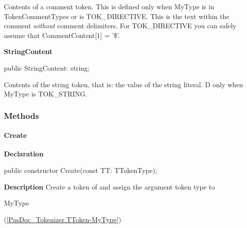 \documentclass{report}
\newif\ifpdf
\begin{document}
\begin{list}{}
\begin{flushleft}
\ifpdf
\end{flushleft}
\fi


\par Contents of a comment token. This is defined only when MyType is in TokenCommentTypes or is TOK{\_}DIRECTIVE. This is the text within the comment \textit{without} comment delimiters. For TOK{\_}DIRECTIVE you can safely assume that CommentContent[1] = '{\$}'.\label{PasDoc_Tokenizer.TToken-StringContent}
\item[\textbf{StringContent}\hfill]
\ifpdf
\begin{flushleft}
\fi
\begin{ttfamily}
public StringContent: string;\end{ttfamily}

\ifpdf
\end{flushleft}
\fi


\par Contents of the string token, that is: the value of the string literal. D only when MyType is TOK{\_}STRING.\end{list}
\subsubsection*{\large{\textbf{Methods}}\normalsize\hspace{1ex}\hfill}
\paragraph*{Create}\hspace*{\fill}

\label{PasDoc_Tokenizer.TToken-Create}
\begin{list}{}{
\setlength{\itemindent}{0cm}
\setlength{\listparindent}{0cm}
\setlength{\leftmargin}{\evensidemargin}
\addtolength{\leftmargin}{\tmplength}
\settowidth{\labelsep}{X}
\addtolength{\leftmargin}{\labelsep}
\setlength{\labelwidth}{\tmplength}
}
\item[\textbf{Declaration}\hfill]
\ifpdf
\begin{flushleft}
\fi
\begin{ttfamily}
public constructor Create(const TT: TTokenType);\end{ttfamily}

\ifpdf
\end{flushleft}
\fi

\par
\item[\textbf{Description}]
Create a token of and assign the argument token type to \begin{ttfamily}MyType\end{ttfamily}(\ref{PasDoc_Tokenizer.TToken-MyType})

\end{list}
\end{document}
